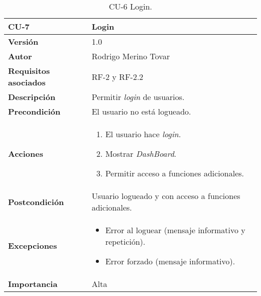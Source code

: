 \begin{table}[p]
	\centering
	\begin{tabularx}{\linewidth}{ p{} p{} }
		\toprule
		\textbf{CU-7}    & \textbf{Login}\\
		\toprule
		\textbf{Versión}              & 1.0    \\
		\textbf{Autor}                & Rodrigo Merino Tovar \\
		\textbf{Requisitos asociados} & RF-2 y RF-2.2 \\
		\textbf{Descripción}          & Permitir \emph{login} de usuarios.\\
		\textbf{Precondición}         & El usuario no está logueado. \\
		\textbf{Acciones}             &
		\begin{enumerate}
			\def\labelenumi{\arabic{enumi}.}
			\tightlist
			\item El usuario hace \emph{login}. 
			\item Mostrar \emph{DashBoard}. 
			\item Permitir acceso a funciones adicionales.
		\end{enumerate}\\
		\textbf{Postcondición}        & Usuario logueado y con acceso a funciones adicionales. \\
		\textbf{Excepciones}          & 
		\begin{itemize}
			\tightlist
			\item Error al loguear (mensaje informativo y repetición). 
			\item Error forzado (mensaje informativo). 
		\end{itemize}\\
		\textbf{Importancia}          & Alta \\
		\bottomrule
	\end{tabularx}
	\caption{CU-6 Login.}
\end{table}


